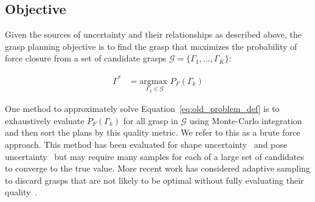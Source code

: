 \documentclass[10pt, conference]{ieeeconf}      %
\newcommand{\bc}{\mathbf{c}}
\newcommand{\bj}{\mathbf{j}}
\newcommand{\bn}{\mathbf{n}}
\newcommand{\mG}{\mathcal{G}}
\newcommand{\mW}{\mathcal{W}}
\begin{document}
%
%
% 



\subsection{Objective}

Given the sources of uncertainty and their relationships as described above, the grasp planning objective is to find the grasp that maximizes the probability of force closure from a set of candidate grasps $\mG = \{\Gamma_1, ..., \Gamma_K\}$:

\vspace{-2ex}
\begin{align}
\Gamma^* &= \underset{\Gamma_k \in \mG}{\text{argmax }} P_F\left( \Gamma_k\right) \label{eq:old_problem_def}
\end{align}



One method to approximately solve Equation~\ref{eq:old_problem_def} is to exhaustively evaluate $P_F(\Gamma_k)$ for all grasp in $\mG$ using Monte-Carlo integration and then sort the plans by this quality metric.
We refer to this as a brute force approach. 
This method has been evaluated for shape uncertainty~\cite{christopoulos2007handling, kehoe2012estimating} and pose uncertainty~\cite{weisz2012pose} but may require many samples for each of a large set of candidates to converge to the true value.
More recent work has considered adaptive sampling to discard grasps that are not likely to be optimal without fully evaluating their quality~\cite{kehoe2012toward}.
\end{document}
